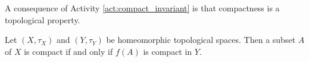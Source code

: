 \begin{comment}

\ActivitySolution

\ba 
\item To prove that $f(A)$ is a compact subset of $Y$, let $\{O_{\alpha}\}$ be a collection of open subsets of $Y$ for $\alpha$ in some indexing set $I$ such that $f(A) \subseteq \bigcup_{\alpha \in I} O_{\alpha}$. We will show that there is a positive integer $n$ and a finite collection $O_{\alpha_1}$, $O_{\alpha_2}$, $\ldots$, $O_{\alpha_n}$, of sets in $\{O_{\alpha}\}_{\alpha \in I}$ that cover $f(A)$. 

\item Since $f$ is continuous, the sets $U_{\alpha} = f^{-1}(O_{\alpha})$ are open in $X$ for each $\alpha \in I$. Also, if $a \in A$, then $f(a) \in \bigcup_{\alpha \in I} O_{\alpha}$. So $f(a) \in O_{\beta}$ for some $\beta \in I$. Then $a \in f^{-1}(O_{\beta}) = U_{\beta} \subseteq \bigcup_{\alpha \in I} U_{\alpha}$. So $A \subseteq \bigcup_{\alpha \in I} U_{\alpha}$. Thus, the sets $U_{\alpha}$ for $\alpha \in I$ form an open cover of $A$.

\item The fact that $A$ is compact means that there is a positive integer $n$ and a finite collection $U_{\alpha_1}$, $U_{\alpha_2}$, $\ldots$, $U_{\alpha_n}$, of sets in $\{U_{\alpha}\}_{\alpha \in I}$ that cover $A$.

\item We will prove that $f(A) \subseteq \bigcup_{i=1}^n O_{\alpha_i}$, which will complete our proof that every open cover of  $f(A)$ in $Y$ has a finite sub-cover. 

Let $b \in f(A)$. Then $f^{-1}(b) \in A \subseteq \bigcup_{i=1}^n U_{\alpha_i}$. It follows that $f^{-1}(b) \in U_{\alpha_i}$ for some $1 \leq i \leq n$. Then $b \in f\left(U_{\alpha_i}\right) \subseteq O_{\alpha_i}$. Therefore, 
\[f(A) \subseteq \bigcup_{i=1}^n O_{\alpha_i}.\]
This verifies that every open cover of $f(A)$ has a finite subcover.  

\ea

\end{comment}

A consequence of Activity \ref{act:compact_invariant} is that compactness is a topological property. 

\begin{corollary} Let $(X, \tau_X)$ and $(Y, \tau_Y)$ be homeomorphic topological spaces. Then a subset $A$ of $X$ is compact if and only if $f(A)$ is compact in $Y$. 
\end{corollary}

